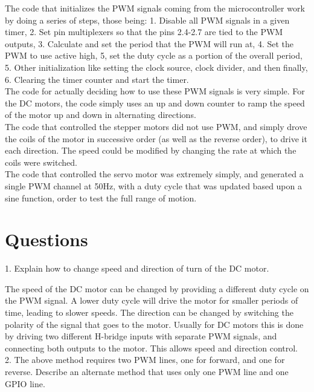 \documentclass[CMPE]{KGCOEReport}
\begin{document}
The code that initializes the PWM signals coming from the
microcontroller work by doing a series of steps, those being: 1. Disable all
PWM signals in a given timer, 2. Set pin multiplexers so that the pins 2.4-2.7
are tied to the PWM outputs, 3. Calculate and set the period that the PWM will
run at, 4. Set the PWM to use active high, 5, set the duty cycle as a portion
of the overall period, 5. Other initialization like setting the clock source,
clock divider, and then finally, 6. Clearing the timer counter and start the
timer. \\

The code for actually deciding how to use these PWM signals is very simple.
For the DC motors, the code simply uses an up and down counter to ramp the
speed of the motor up and down in alternating directions. \\

The code that controlled the stepper motors did not use PWM, and simply drove
the coils of the motor in successive order (as well as the reverse order), to
drive it each direction. The speed could be modified by changing the rate at
which the coils were switched.\\

The code that controlled the servo motor was extremely simply, and generated
a single PWM channel at 50Hz, with a duty cycle that was updated based upon
a sine function, order to test the full range of motion.\\

\section*{Questions}
\setlength{\parindent}{20pt}

1. Explain how to change speed and direction of turn of the DC motor. 

\indent The speed of the DC motor can be changed by providing a different
duty cycle on the PWM signal. A lower duty cycle will drive the motor for
smaller periods of time, leading to slower speeds. The direction can be changed
by switching the polarity of the signal that goes to the motor. Usually for DC
motors this is done by driving two different H-bridge inputs with separate
PWM signals, and connecting both outputs to the motor. This allows speed and
direction control. \\

2. The above method requires two PWM lines, one for forward, and
one for reverse. Describe an alternate method that uses only one PWM line and
one GPIO line.
\end{document}
